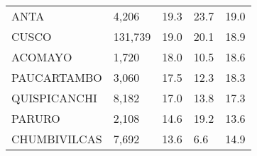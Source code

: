 \begin{tabular}{lllll}
	\cellcolor[HTML]{FF5050}ANTA                                   & 4,206                                                                 & 19.3                                                                             & 23.7                                                                        & 19.0                                                                                \\
	\cellcolor[HTML]{FF5050}CUSCO                                  & 131,739                                                               & 19.0                                                                             & 20.1                                                                        & 18.9                                                                                \\
	\cellcolor[HTML]{FF5050}ACOMAYO                                & 1,720                                                                 & 18.0                                                                             & 10.5                                                                        & 18.6                                                                                \\
	\cellcolor[HTML]{FF5050}PAUCARTAMBO                            & 3,060                                                                 & 17.5                                                                             & 12.3                                                                        & 18.3                                                                                \\
	\cellcolor[HTML]{FF5050}QUISPICANCHI                           & 8,182                                                                 & 17.0                                                                             & 13.8                                                                        & 17.3                                                                                \\
	\cellcolor[HTML]{FF5050}PARURO                                 & 2,108                                                                 & 14.6                                                                             & 19.2                                                                        & 13.6                                                                                \\
	\cellcolor[HTML]{FF5050}CHUMBIVILCAS                           & 7,692                                                                 & 13.6                                                                             & 6.6                                                                         & 14.9                                                                                \\

\end{tabular}
